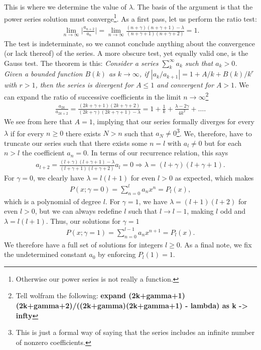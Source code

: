 This is where we determine the value of $\lambda$.
The basis of the argument is that the power series solution must converge\footnote{Otherwise our power series is not really a function.}.
As a first pass, let us perform the ratio test:
\begin{eqnarray}
    \lim_{n \rightarrow \infty} \Big| \frac{a_{n+2}}{a_{n}} \Big| = \lim_{n \rightarrow \infty} \frac{(n+\gamma)(n+\gamma+1) - \lambda}{(n+\gamma+1)(n+\gamma+2)} = 1
.\end{eqnarray}
The test is indeterminate, so we cannot conclude anything about the convergence (or lack thereof) of the series.
A more obscure test, yet equally valid one, is the Gauss test.
The theorem is this: \textit{Consider a series $\sum_{k}^{\infty} a_{k}$ such that $a_{k} > 0$. Given a bounded function $B(k)$ as $k \rightarrow \infty$, if $|a_{k}/a_{k+1}| = 1 + A/k + B(k)/k^{r}$ with $r > 1$, then the series is divergent for $A \leq 1$ and convergent for $A > 1$.}
We can expand the ratio of successive coefficients in the limit $n \rightarrow \infty$\footnote{Tell wolfram the following: \textbf{expand (2k+gamma+1)(2k+gamma+2)/((2k+gamma)(2k+gamma+1) - lambda) as k -> infty}}
\begin{eqnarray}
    \frac{a_{2k}}{a_{2k+2}} = \frac{(2k+\gamma+1)(2k+\gamma+2)}{(2k+\gamma)(2k+\gamma+1) - \lambda} = 1 + \frac{1}{k} + \frac{\lambda - 2\gamma}{4k^2} + \ldots
.\end{eqnarray}
We see from here that $A = 1$, implying that our series formally diverges for every $\lambda$ if for every $n \geq 0$ there exists $N > n$ such that $a_{N} \ne 0$\footnote{This is just a formal way of saying that the series includes an infinite number of nonzero coefficients.}.
We, therefore, have to truncate our series such that there exists some $n=l$ with $a_{l} \ne 0$ but for each $n > l$ the coefficient $a_{n} = 0$.
In terms of our recurrence relation, this says
\begin{eqnarray}
    a_{l+2} = \frac{(l+\gamma)(l+\gamma+1) - \lambda}{(l+\gamma+1)(l+\gamma+2)} a_{l} = 0 \Rightarrow \lambda = (l+\gamma)(l+\gamma+1)
.\end{eqnarray}
For $\gamma=0$, we clearly have $\lambda = l(l+1)$ for even $l > 0$ as expected, which makes
\begin{eqnarray}
    P(x;\gamma=0) = \sum_{n=0}^{l} a_{n} x^{n} = P_{l}(x)
,\end{eqnarray}
which is a polynomial of degree $l$.
For $\gamma = 1$, we have $\lambda = (l+1)(l+2)$ for even $l > 0$, but we can always redefine $l$ such that $l \rightarrow l - 1$, making $l$ odd and $\lambda = l(l+1)$.
Thus, our solutions for $\gamma = 1$
\begin{eqnarray}
    P(x;\gamma=1) = \sum_{n=0}^{l-1} a_{n} x^{n+1} = P_{l}(x)
.\end{eqnarray}
We therefore have a full set of solutions for integers $l \geq 0$.
As a final note, we fix the undetermined constant $a_0$ by enforcing $P_{l}(1) = 1$.

